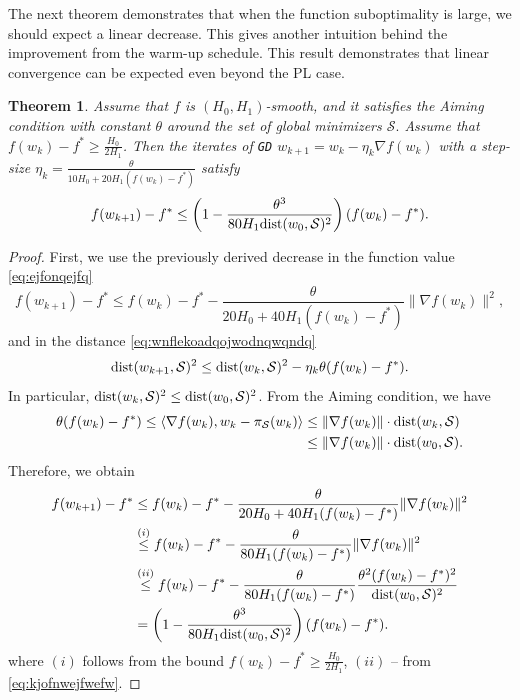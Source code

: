 \documentclass[a4paper,11pt]{article}
\newcommand{\algname}[1]{\texttt{#1}}
\newcommand{\cS}{\mathcal{S}}
\newcommand{\1}{\mathbbm{1}}
\theoremstyle{plain}
\newtheorem{theorem}{Theorem}[section]
\begin{document}
The next theorem demonstrates that when the function suboptimality is large, we should expect a linear decrease. This gives another intuition behind the improvement from the warm-up schedule. This result demonstrates that linear convergence can be expected even beyond the PL case.
\begin{theorem}
    Assume that $f$ is $(H_0,H_1)$-smooth, and it satisfies the Aiming condition with constant $\theta$ around the set of global minimizers $\cS.$ Assume that $f(w_k) - f^* \ge \frac{H_0}{2H_1}$. Then the iterates of \algname{GD} $w_{k+1} = w_k - \eta_k\nabla f(w_k)$ with a step-size $\eta_k = \frac{\theta}{10H_0+20H_1(f(w_k)-f^*)}$ satisfy
    \[ f(w_{k+1})-f^* \leq 
    \left(1-\frac{\theta^3}{80H_1{\rm dist}(w_0,\cS)^2}\right)(f(w_k)-f^*).
    \]
\end{theorem}
\begin{proof}
    First, we use the previously derived decrease in the function value \eqref{eq:ejfonqejfq}
    \[
    f(w_{k+1}) - f^* \le f(w_k) - f^* - \frac{\theta}{20H_0+40H_1(f(w_k)-f^*)}\|\nabla f(w_k)\|^2,
    \]
    and in the distance \eqref{eq:wnflekoadqojwodnqwqndq}
    \[
    {\rm dist}(w_{k+1},\cS)^2 \le {\rm dist}(w_k,\cS)^2 - \eta_k\theta(f(w_k)-f^*).
    \]
    In particular, ${\rm dist}(w_k,\cS)^2 \le {\rm dist}(w_0,\cS)^2$. From the Aiming condition, we have 
    \begin{align}\label{eq:kjofnwejfwefw}
    \theta(f(w_k)-f^*) \le\langle\nabla f(w_k),w_k-\pi_{\cS}(w_k)\rangle &\le \|\nabla f(w_k)\|\cdot {\rm dist}(w_k,\cS)\notag\\
    &\le \|\nabla f(w_k)\|\cdot {\rm dist}(w_0,\cS).
    \end{align}
    Therefore, we obtain
    \begin{align*}
        f(w_{k+1})-f^* &\le f(w_k) - f^* - \frac{\theta}{20H_0 + 40H_1(f(w_k)-f^*)}\|\nabla f(w_k)\|^2\\
        &\overset{(i)}{\le} f(w_k) - f^* - \frac{\theta}{80H_1(f(w_k)-f^*)}\|\nabla f(w_k)\|^2\\
        &\overset{(ii)}{\le} f(w_k) - f^* - \frac{\theta}{80H_1(f(w_k)-f^*)}\frac{\theta^2(f(w_k)-f^*)^2}{{\rm dist}(w_0,\cS)^2}\\
        &= \left(1-\frac{\theta^3}{80H_1{\rm dist}(w_0,\cS)^2}\right)(f(w_k)-f^*).
    \end{align*}
    where $(i)$ follows from the bound $f(w_k)-f^* \ge \frac{H_0}{2H_1}$, $(ii)$ -- from \eqref{eq:kjofnwejfwefw}.
\end{proof}
\end{document}
